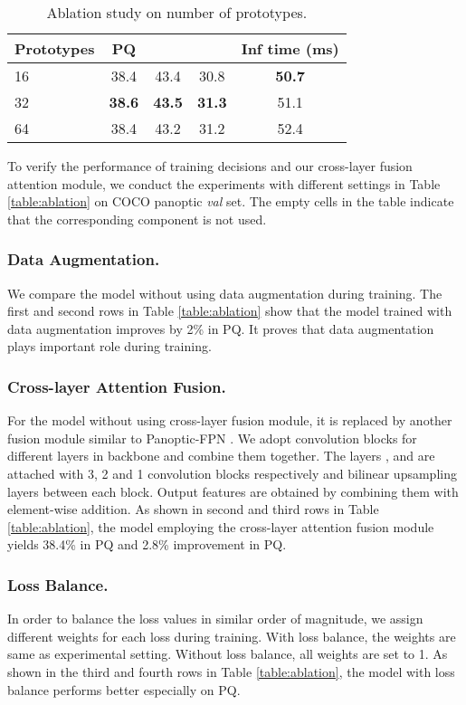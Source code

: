\documentclass[runningheads]{llncs}
\begin{document}
\begin{table}[!tb]
\centering
     \caption{Ablation study on number of prototypes.}
\begin{tabular}{l  | c c c c}
    \hline
    Prototypes &   PQ                   &  &  & Inf time (ms) \\ \hline \hline
         16    & 38.4 & 43.4 & 30.8 & \textbf{50.7}\\ \hline
          32   & \textbf{38.6} & \textbf{43.5} & \textbf{31.3} & 51.1\\ \hline
        64     & 38.4 & 43.2 & 31.2  & 52.4 \\ \hline
    
    \end{tabular}
    \label{table:ablation_prototypes}
\end{table}

To verify the performance of training decisions and our cross-layer fusion attention module, we conduct the experiments with different settings in Table \ref{table:ablation} on COCO panoptic \emph{val} set. The empty cells in the table indicate that the corresponding component is not used.

\subsubsection{Data Augmentation.}
We compare the model without using data augmentation during training. The first and second rows in Table \ref{table:ablation} show that the model trained with data augmentation improves by 2\% in PQ. It proves that data augmentation plays important role during training.

\subsubsection{Cross-layer Attention Fusion.}
For the model without using cross-layer fusion module, it is replaced by another fusion module similar to Panoptic-FPN \cite{DeGeus2018a}. We adopt convolution blocks for different layers in backbone and combine them together. The layers ,  and  are attached with 3, 2 and 1 convolution blocks respectively and  bilinear upsampling layers between each block. Output features are obtained by combining them with element-wise addition. As shown in second and third rows in Table \ref{table:ablation}, the model employing the cross-layer attention fusion module yields 38.4\% in PQ and 2.8\% improvement in PQ.

\subsubsection{Loss Balance.}
In order to balance the loss values in similar order of magnitude, we assign different weights for each loss during training. With loss balance, the weights are same as experimental setting. Without loss balance, all weights are set to 1.  As shown in the third and fourth rows in Table \ref{table:ablation}, the model with loss balance performs better especially on PQ.
\end{document}
